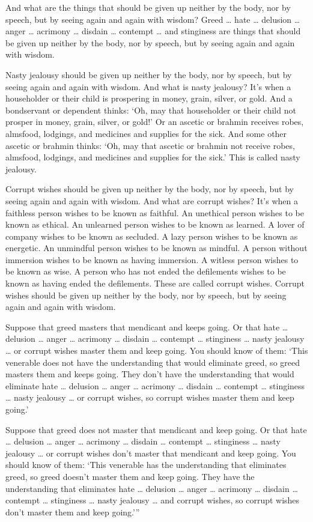 \documentclass[12pt,openany]{book}%
\begin{document}
And what are the things that should be given up neither by the body, nor by speech, but by seeing again and again with wisdom? Greed … hate … delusion … anger … acrimony … disdain … contempt … and stinginess are things that should be given up neither by the body, nor by speech, but by seeing again and again with wisdom. 

Nasty jealousy should be given up neither by the body, nor by speech, but by seeing again and again with wisdom. And what is nasty jealousy? It’s when a householder or their child is prospering in money, grain, silver, or gold. And a bondservant or dependent thinks: ‘Oh, may that householder or their child not prosper in money, grain, silver, or gold!’ Or an ascetic or brahmin receives robes, almsfood, lodgings, and medicines and supplies for the sick. And some other ascetic or brahmin thinks: ‘Oh, may that ascetic or brahmin not receive robes, almsfood, lodgings, and medicines and supplies for the sick.’ This is called nasty jealousy. 

Corrupt wishes should be given up neither by the body, nor by speech, but by seeing again and again with wisdom. And what are corrupt wishes? It’s when a faithless person wishes to be known as faithful. An unethical person wishes to be known as ethical. An unlearned person wishes to be known as learned. A lover of company wishes to be known as secluded. A lazy person wishes to be known as energetic. An unmindful person wishes to be known as mindful. A person without immersion wishes to be known as having immersion. A witless person wishes to be known as wise. A person who has not ended the defilements wishes to be known as having ended the defilements. These are called corrupt wishes. Corrupt wishes should be given up neither by the body, nor by speech, but by seeing again and again with wisdom. 

Suppose that greed masters that mendicant and keeps going. Or that hate … delusion … anger … acrimony … disdain … contempt … stinginess … nasty jealousy … or corrupt wishes master them and keep going. You should know of them: ‘This venerable does not have the understanding that would eliminate greed, so greed masters them and keeps going. They don’t have the understanding that would eliminate hate … delusion … anger … acrimony … disdain … contempt … stinginess … nasty jealousy … or corrupt wishes, so corrupt wishes master them and keep going.’ 

Suppose that greed does not master that mendicant and keep going. Or that hate … delusion … anger … acrimony … disdain … contempt … stinginess … nasty jealousy … or corrupt wishes don’t master that mendicant and keep going. You should know of them: ‘This venerable has the understanding that eliminates greed, so greed doesn’t master them and keep going. They have the understanding that eliminates hate … delusion … anger … acrimony … disdain … contempt … stinginess … nasty jealousy … and corrupt wishes, so corrupt wishes don’t master them and keep going.’” 
\end{document}
